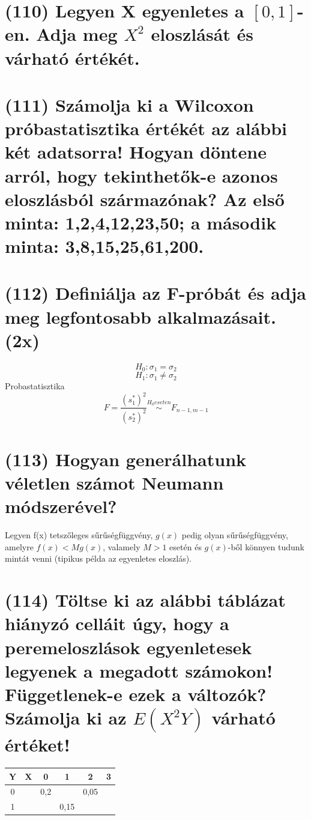\documentclass[12p]{article}
\begin{document}
\section{(110) Legyen X egyenletes a $[0, 1]$-en. Adja meg $X^2$ eloszlását és várható értékét.}

\section{(111) Számolja ki a Wilcoxon próbastatisztika értékét az alábbi két adatsorra! Hogyan döntene arról, hogy tekinthetők-e azonos eloszlásból származónak? Az első minta: 1,2,4,12,23,50;
a második minta: 3,8,15,25,61,200.}

\section{(112) Definiálja az F-próbát és adja meg legfontosabb alkalmazásait. (2x)}

$$H_0: \sigma_1 = \sigma_2$$
$$H_1: \sigma_1 \neq \sigma_2$$
Probastatisztika
$$F= \frac{(s_1^{*})^2}{(s_2^{*})^2} \stackrel{H_0 eseten}{\sim} F_{n-1,m-1}$$

\section{(113)  Hogyan generálhatunk véletlen számot Neumann módszerével?}

Legyen f(x) tetszőleges sűrűségfüggvény, $g(x)$ pedig olyan sűrűségfüggvény, amelyre $f(x) < Mg(x)$, valamely $M>1$ esetén és $g(x)$-ből könnyen tudunk mintát venni (tipikus példa az egyenletes eloszlás).

\section{(114) Töltse ki az alábbi táblázat hiányzó celláit úgy, hogy a peremeloszlások egyenletesek
legyenek a megadott számokon! Függetlenek-e ezek a változók? Számolja ki az $E(X^2Y)$ várható értéket!}

\begin{center}
 \begin{tabular}{| c c || c | c | c | c |} 
 \hline
 Y & X &  0 & 1 & 2 & 3\\ [0.5ex] 
 \hline\hline
 0 &  & 0,2 & & 0,05 & \\ 
 \hline
 1 &  & & 0,15 & & \\
 \hline\hline
\end{tabular}
\end{center}
\end{document}
